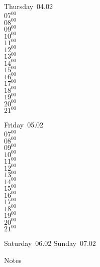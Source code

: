\documentclass[11pt,a4paper]{book}\usepackage[]{graphicx}\usepackage[]{color}
\begin{document}
\clearpage
\begin{headerbox}
\end{headerbox}
\begin{weekdaybox}
  Thursday~04.02\\
  { 
  \vfill
  $07^{00}$\\
$08^{00}$\\
$09^{00}$\\
$10^{00}$\\
$11^{00}$\\
$12^{00}$\\
$13^{00}$\\
$14^{00}$\\
$15^{00}$\\
$16^{00}$\\
$17^{00}$\\
$18^{00}$\\
$19^{00}$\\
$20^{00}$\\
$21^{00}$\\
  }
\end{weekdaybox} 
\begin{weekdaybox}
  Friday~05.02\\
  { 
  \vfill
  $07^{00}$\\
$08^{00}$\\
$09^{00}$\\
$10^{00}$\\
$11^{00}$\\
$12^{00}$\\
$13^{00}$\\
$14^{00}$\\
$15^{00}$\\
$16^{00}$\\
$17^{00}$\\
$18^{00}$\\
$19^{00}$\\
$20^{00}$\\
$21^{00}$\\
  }
\end{weekdaybox}
\begin{weekendbox}
  Saturday~06.02
  \tcblower
  Sunday~07.02
\end{weekendbox} %
\begin{notebox}
  Notes
\end{notebox}
\clearpage
\end{document}
